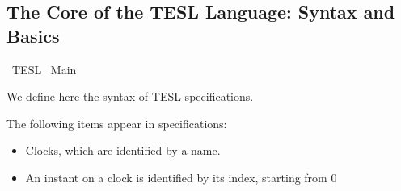 %
\begin{isabellebody}%
%
%
\begin{isamarkuptext}%
\chapter[Core TESL: Syntax and Basics]{The Core of the TESL Language: Syntax and Basics}%
\end{isamarkuptext}\isamarkuptrue%
%
\isadelimtheory
%
\endisadelimtheory
%
\isatagtheory
{}\isamarkupfalse%
\ TESL\isanewline
{}\ Main\isanewline
\isanewline
{}%
\endisatagtheory
{\isafoldtheory}%
%
\isadelimtheory
%
\endisadelimtheory
%
\isadelimdocument
%
\endisadelimdocument
%
\isatagdocument
%
\isamarkuptrue%
%
\endisatagdocument
{\isafolddocument}%
%
\isadelimdocument
%
\endisadelimdocument
%
\begin{isamarkuptext}%
We define here the syntax of TESL specifications.%
\end{isamarkuptext}\isamarkuptrue%
%
\isadelimdocument
%
\endisadelimdocument
%
\isatagdocument
%
\isamarkuptrue%
%
\endisatagdocument
{\isafolddocument}%
%
\isadelimdocument
%
\endisadelimdocument
%
\begin{isamarkuptext}%
The following items appear in specifications:

%
\begin{itemize}%
\item Clocks, which are identified by a name.

\item An instant on a clock is identified by its index, starting from 0


\end{itemize}
\end{isamarkuptext}
\end{isabellebody}
